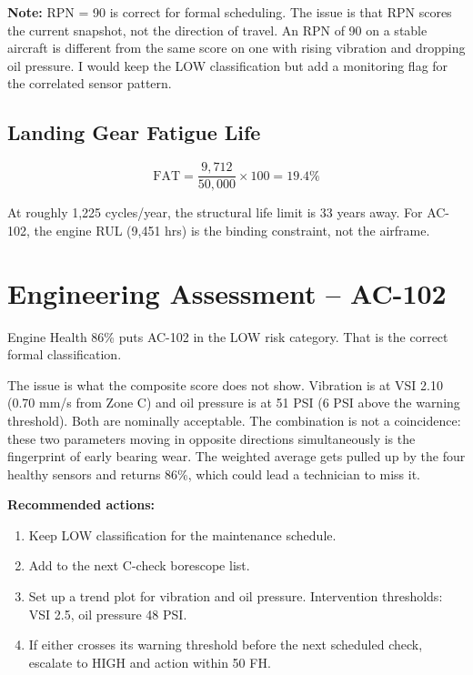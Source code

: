 \documentclass[11pt, a4paper]{report}
\begin{document}
\medskip
\noindent\textbf{Note:} RPN = 90 is correct for formal scheduling. The issue
is that RPN scores the current snapshot, not the direction of travel. An RPN of
90 on a stable aircraft is different from the same score on one with rising
vibration and dropping oil pressure. I would keep the LOW classification but add
a monitoring flag for the correlated sensor pattern.

\section{Landing Gear Fatigue Life}

\[
\text{FAT} = \frac{9{,}712}{50{,}000} \times 100 = \mathbf{19.4\%}
\]

At roughly 1,225 cycles/year, the structural life limit is 33 years away.
For AC-102, the engine RUL (9,451 hrs) is the binding constraint, not the
airframe.

\chapter{Engineering Assessment -- AC-102}

Engine Health 86\% puts AC-102 in the LOW risk category. That is the correct
formal classification.

The issue is what the composite score does not show. Vibration is at VSI 2.10
(0.70 mm/s from Zone C) and oil pressure is at 51 PSI (6 PSI above the warning
threshold). Both are nominally acceptable. The combination is not a coincidence:
these two parameters moving in opposite directions simultaneously is the
fingerprint of early bearing wear. The weighted average gets pulled up by the
four healthy sensors and returns 86\%, which could lead a technician to miss it.

\medskip
\noindent\textbf{Recommended actions:}

\begin{enumerate}
  \item Keep LOW classification for the maintenance schedule.
  \item Add to the next C-check borescope list.
  \item Set up a trend plot for vibration and oil pressure.
        Intervention thresholds: VSI 2.5, oil pressure 48 PSI.
  \item If either crosses its warning threshold before the next scheduled
        check, escalate to HIGH and action within 50 FH.
\end{enumerate}
\end{document}
